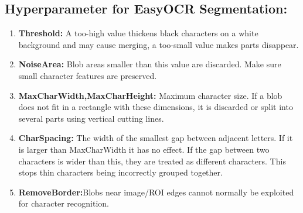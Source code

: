 \subsection*{Hyperparameter for EasyOCR Segmentation:} \cite{EasyOCR:2018}
\begin{enumerate}
	\item \textbf{Threshold:} A too-high value thickens black characters on a white background and may cause merging, a too-small value makes parts disappear. 
	\item \textbf{NoiseArea:} Blob areas smaller than this value are discarded. Make sure small character features are preserved.
	\item \textbf{MaxCharWidth,MaxCharHeight:} Maximum character size. If a blob does not fit in a rectangle with these dimensions, it is discarded or split into several parts using vertical cutting lines.
	\item \textbf{CharSpacing:} The width of the smallest gap between adjacent letters. If it is larger than MaxCharWidth it has no effect. If the gap between two characters is wider than this, they are treated as different characters. This stops thin characters being incorrectly grouped together.
	\item \textbf{RemoveBorder:}Blobs near image/ROI edges cannot normally be exploited for character recognition.
\end{enumerate}
